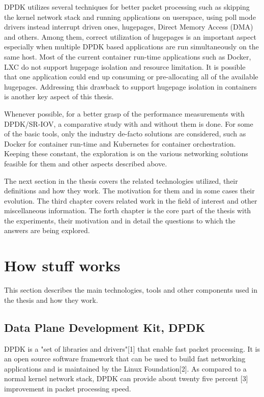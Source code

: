 \documentclass[english, 12pt, a4paper, elec, utf8, a-1b, online]{aaltothesis}
\begin{document}
DPDK utilizes several techniques for better packet processing such as skipping the kernel network stack and running applications on userspace, using poll mode drivers instead interrupt driven ones, hugepages, Direct Memory Access (DMA) and others. Among them, correct utilization of hugepages is an important aspect especially when multiple DPDK based applications are run simultaneously on the same host. Most of the current container run-time applications such as Docker, LXC do not support hugepage isolation and resource limitation. It is possible that one application could end up consuming or pre-allocating all of the available hugepages. Addressing this drawback to support hugepage isolation in containers is another key aspect of this thesis.

Whenever possible, for a better grasp of the performance measurements with DPDK/SR-IOV, a comparative study with and without them is done. For some of the basic tools, only the industry de-facto solutions are considered, such as  Docker for container run-time and Kubernetes for container orchestration. Keeping these constant, the exploration is on the various networking solutions feasible for them and other aspects described above.

The next section in the thesis covers the related technologies utilized, their definitions and how they work. The motivation for them and in some cases their evolution. The third chapter covers related work in the field of interest and other miscellaneous information. The forth chapter is the core part of the thesis with the experiments, their motivation and in detail the questions to which the answers are being explored.

\clearpage
\section{How stuff works}
This section describes the main technologies, tools and other components used in the thesis and how they work.
\subsection{Data Plane Development Kit, DPDK}
DPDK is a "set of libraries and drivers"[1] that enable fast packet processing. It is an open source software framework that can be used to build fast networking applications and is maintained by the Linux Foundation[2]. As compared to a normal kernel network stack, DPDK can provide about twenty five percent [3] improvement in packet processing speed.
\end{document}
